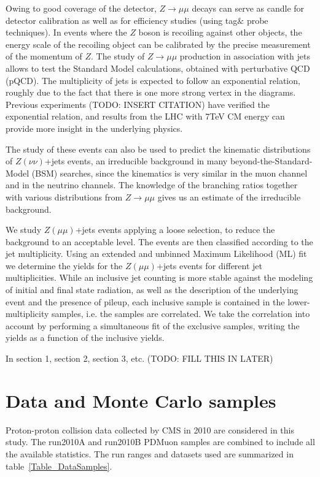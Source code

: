 \documentclass{cmspaper}
\begin{document}
Owing to good coverage of the detector, $Z\to \mu\mu$ decays can serve
as candle for detector calibration as well as for efficiency studies
(using tag$\&$ probe techniques). In events where the $Z$ boson is
recoiling against other objects, the energy scale of the recoiling
object can be calibrated by the precise measurement of the momentum of
$Z$.  The study of $Z\to \mu\mu$ production in association with jets
allows to test the Standard Model calculations, obtained with
perturbative QCD (pQCD). The multiplicity of jets is expected to
follow an exponential relation, roughly due to the fact that there is
one more strong vertex in the diagrams.  Previous experiments (TODO:
INSERT CITATION) have verified the exponential relation, and results
from the LHC with 7TeV CM energy can provide more insight in the
underlying physics.

The study of these events can also be used to predict the kinematic
distributions of $Z(\nu\nu)$+jets events, an irreducible background in
many beyond-the-Standard-Model (BSM) searches, since the kinematics is
very similar in the muon channel and in the neutrino channels.  The
knowledge of the branching ratios together with various distributions
from $Z\to\mu\mu$ gives us an estimate of the irreducible background.

We study $Z(\mu\mu)$+jets events applying a loose selection, to reduce
the background to an acceptable level. The events are then classified
according to the jet multiplicity. Using an extended and unbinned
Maximum Likelihood (ML) fit we determine the yields for the
$Z(\mu\mu)$+jets events for different jet multiplicities.  While an
inclusive jet counting is more stable against the modeling of initial
and final state radiation, as well as the description of the
underlying event and the presence of pileup, each inclusive sample
is contained in the lower-multiplicity samples, i.e. the samples are 
correlated. We take the correlation into account by performing
a simultaneous fit of the exclusive samples, writing the yields
as a function of the inclusive yields.

In section 1, section 2, section 3, etc.  (TODO: FILL THIS IN LATER)

\section{Data and Monte Carlo samples}

Proton-proton collision data collected by CMS in 2010 are considered
in this study. The run2010A and run2010B PDMuon samples are combined
to include all the available statistics. The run ranges and datasets
used are summarized in table~\ref{Table_DataSamples}.
\end{document}
